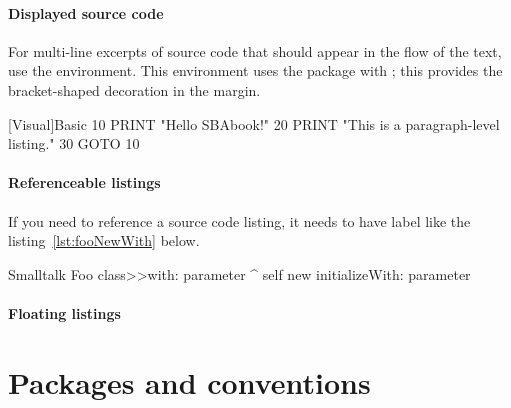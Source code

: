 \documentclass[english,twoside,openany,showtrims]{sbabook}
\begin{document}
\paragraph{Displayed source code}
For multi-line excerpts of source code that should appear in the flow of the
text, use the  environment.
This environment uses the  package with ; this
provides the bracket-shaped decoration in the margin.

\begin{displaycode}{[Visual]Basic}
10 PRINT "Hello SBAbook!"
20 PRINT "This is a paragraph-level listing."
30 GOTO 10
\end{displaycode}


\paragraph{Referenceable listings}
If you need to reference a source code listing, it needs to have label like the
listing~\ref{lst:fooNewWith} below.

\begin{listing}[%
  title={A factory method in class \code|Foo|},
  label=lst:fooNewWith,
]{Smalltalk}
Foo class>>with: parameter
  ^ self new
    initializeWith: parameter
\end{listing}

\paragraph{Floating listings}



\section{Packages and conventions}



\clearpage
\textlatin{\lipsum[2-7]}
\end{document}
